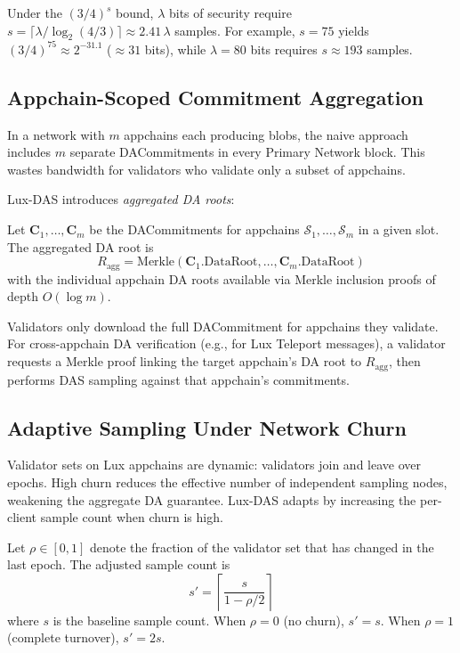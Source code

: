 Under the $(3/4)^s$ bound, $\lambda$ bits of security require $s = \lceil \lambda / \log_2(4/3) \rceil \approx 2.41\,\lambda$ samples. For example, $s = 75$ yields $(3/4)^{75} \approx 2^{-31.1}$ ($\approx 31$ bits), while $\lambda = 80$ bits requires $s \approx 193$ samples.

\subsection{Appchain-Scoped Commitment Aggregation}
\label{sec:protocol:aggregation}

In a network with $m$ appchains each producing blobs, the naive approach includes $m$ separate
DACommitments in every Primary Network block. This wastes bandwidth for validators who validate
only a subset of appchains.

Lux-DAS introduces \emph{aggregated DA roots}:

\begin{definition}
Let $\mathbf{C}_1, \ldots, \mathbf{C}_m$ be the DACommitments for appchains
$\mathcal{S}_1, \ldots, \mathcal{S}_m$ in a given slot. The aggregated DA root is
\[
    R_{\text{agg}} = \text{Merkle}(\mathbf{C}_1.\text{DataRoot}, \ldots, \mathbf{C}_m.\text{DataRoot})
\]
with the individual appchain DA roots available via Merkle inclusion proofs of depth
$O(\log m)$.
\end{definition}

Validators only download the full DACommitment for appchains they validate. For cross-appchain
DA verification (e.g., for Lux Teleport messages), a validator requests a Merkle proof linking
the target appchain's DA root to $R_{\text{agg}}$, then performs DAS sampling against that
appchain's commitments.

\subsection{Adaptive Sampling Under Network Churn}

Validator sets on Lux appchains are dynamic: validators join and leave over epochs. High
churn reduces the effective number of independent sampling nodes, weakening the aggregate
DA guarantee. Lux-DAS adapts by increasing the per-client sample count when churn is high.

\begin{definition}
Let $\rho \in [0,1]$ denote the fraction of the validator set that has changed in the last
epoch. The adjusted sample count is
\[
    s' = \left\lceil \frac{s}{1 - \rho/2} \right\rceil
\]
where $s$ is the baseline sample count. When $\rho = 0$ (no churn), $s' = s$. When
$\rho = 1$ (complete turnover), $s' = 2s$.
\end{definition}

